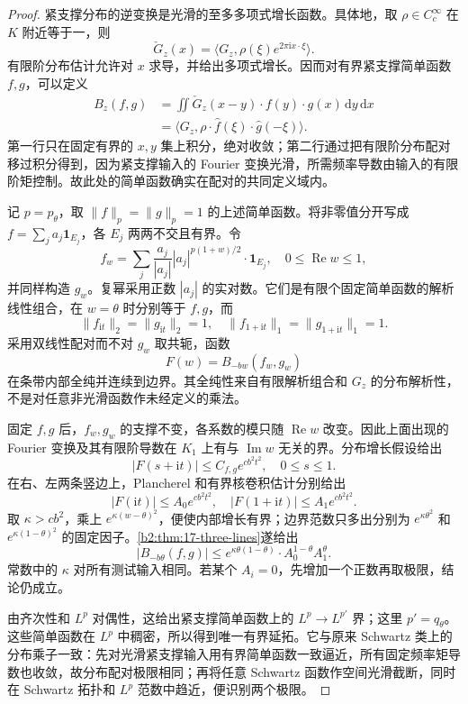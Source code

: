 \begin{proof}
紧支撑分布的逆变换是光滑的至多多项式增长函数。具体地，取 \(\rho\in C_c^\infty\) 在 \(K\) 附近等于一，则
\[
 \check G_z(x)=\langle G_z,\rho(\xi)e^{2\pi\mathrm i x\cdot\xi}\rangle.
\]
有限阶分布估计允许对 \(x\) 求导，并给出多项式增长。因而对有界紧支撑简单函数 \(f,g\)，可以定义
\[
 \begin{aligned}
 B_z(f,g)
 &=\iint\check G_z(x-y)\cdot f(y)\cdot g(x)\,\mathrm dy\,\mathrm dx\\
 &=\langle G_z,\rho\cdot\widehat f(\xi)\cdot\widehat g(-\xi)\rangle.
 \end{aligned}
\]
第一行只在固定有界的 \(x,y\) 集上积分，绝对收敛；第二行通过把有限阶分布配对移过积分得到，因为紧支撑输入的 Fourier 变换光滑，所需频率导数由输入的有限阶矩控制。故此处的简单函数确实在配对的共同定义域内。

记 \(p=p_\theta\)，取 \(\|f\|_p=\|g\|_p=1\) 的上述简单函数。将非零值分开写成 \(f=\sum_j a_j\mathbf1_{E_j}\)，各 \(E_j\) 两两不交且有界。令
\[
 f_w=\sum_j\frac{a_j}{|a_j|}|a_j|^{p(1+w)/2}
 \cdot\mathbf1_{E_j},\quad0\leq\operatorname{Re}w\leq1,
\]
并同样构造 \(g_w\)。复幂采用正数 \(|a_j|\) 的实对数。它们是有限个固定简单函数的解析线性组合，在 \(w=\theta\) 时分别等于 \(f,g\)，而
\[
 \|f_{\mathrm it}\|_2=\|g_{\mathrm it}\|_2=1,
 \quad
 \|f_{1+\mathrm it}\|_1=\|g_{1+\mathrm it}\|_1=1.
\]
采用双线性配对而不对 \(g_w\) 取共轭，函数
\[
 F(w)=B_{-bw}(f_w,g_w)
\]
在条带内部全纯并连续到边界。其全纯性来自有限解析组合和 \(G_z\) 的分布解析性，不是对任意非光滑函数作未经定义的乘法。

固定 \(f,g\) 后，\(f_w,g_w\) 的支撑不变，各系数的模只随 \(\operatorname{Re}w\) 改变。因此上面出现的 Fourier 变换及其有限阶导数在 \(K_1\) 上有与 \(\operatorname{Im}w\) 无关的界。分布增长假设给出
\[
 |F(s+\mathrm it)|\leq C_{f,g}e^{cb^2t^2},
 \quad0\leq s\leq1.
\]
在右、左两条竖边上，Plancherel 和有界核卷积估计分别给出
\[
 |F(\mathrm it)|\leq A_0e^{cb^2t^2},
 \quad
 |F(1+\mathrm it)|\leq A_1e^{cb^2t^2}.
\]
取 \(\kappa>cb^2\)，乘上 \(e^{\kappa(w-\theta)^2}\)，便使内部增长有界；边界范数只多出分别为 \(e^{\kappa\theta^2}\) 和 \(e^{\kappa(1-\theta)^2}\) 的固定因子。\cref{b2:thm:17-three-lines}遂给出
\[
 |B_{-b\theta}(f,g)|
 \leq e^{\kappa\theta(1-\theta)}
 \cdot A_0^{1-\theta}A_1^\theta.
\]
常数中的 \(\kappa\) 对所有测试输入相同。若某个 \(A_i=0\)，先增加一个正数再取极限，结论仍成立。

由齐次性和 \(L^p\) 对偶性，这给出紧支撑简单函数上的 \(L^p\to L^{p'}\) 界；这里 \(p'=q_\theta\)。这些简单函数在 \(L^p\) 中稠密，所以得到唯一有界延拓。它与原来 Schwartz 类上的分布乘子一致：先对光滑紧支撑输入用有界简单函数一致逼近，所有固定频率矩导数也收敛，故分布配对极限相同；再将任意 Schwartz 函数作空间光滑截断，同时在 Schwartz 拓扑和 \(L^p\) 范数中趋近，便识别两个极限。
\end{proof}


